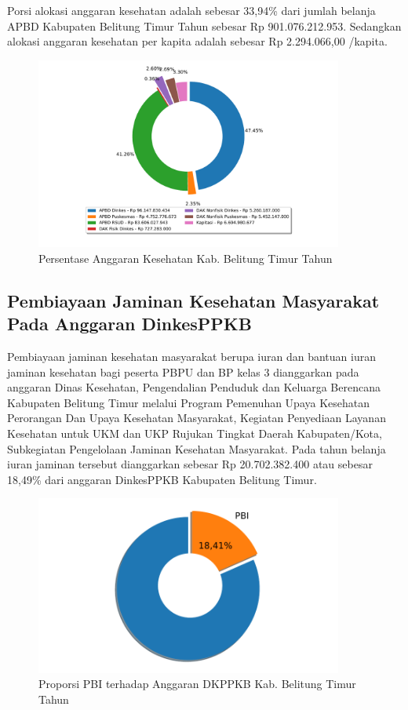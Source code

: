 Porsi alokasi anggaran kesehatan adalah sebesar 33,94\% dari jumlah belanja APBD Kabupaten Belitung Timur Tahun \tP sebesar Rp 901.076.212.953. Sedangkan alokasi anggaran kesehatan per kapita adalah sebesar Rp 2.294.066,00 /kapita.

\begin{figure}[htb]
    \centering{}
    \includegraphics[width=0.9\textwidth]{bab_04/bab_04_03_anggaranKesehatan}
    \caption{Persentase Anggaran Kesehatan Kab. Belitung Timur Tahun \tP}
    \label{fig:Anggaran-Kesehatan}
\end{figure}

\subsection{Pembiayaan Jaminan Kesehatan Masyarakat Pada Anggaran DinkesPPKB}
Pembiayaan jaminan kesehatan masyarakat berupa iuran dan bantuan iuran jaminan kesehatan bagi peserta PBPU dan BP kelas 3 dianggarkan pada anggaran Dinas Kesehatan, Pengendalian Penduduk dan Keluarga Berencana Kabupaten Belitung Timur melalui Program Pemenuhan Upaya Kesehatan Perorangan Dan Upaya Kesehatan Masyarakat, Kegiatan Penyediaan Layanan Kesehatan untuk UKM dan UKP Rujukan Tingkat Daerah Kabupaten/Kota, Subkegiatan Pengelolaan Jaminan Kesehatan Masyarakat. Pada tahun \tP belanja iuran jaminan tersebut dianggarkan sebesar Rp 20.702.382.400 atau sebesar 18,49\% dari anggaran DinkesPPKB Kabupaten Belitung Timur.

\begin{figure}[htb]
	\centering{}
	\includegraphics[width=0.9\textwidth]{bab_04/bab_04_04_proporsiPBI}
	\caption{Proporsi PBI terhadap Anggaran DKPPKB Kab. Belitung Timur Tahun \tP}
	\label{fig:Proporsi-PBI}
\end{figure}

